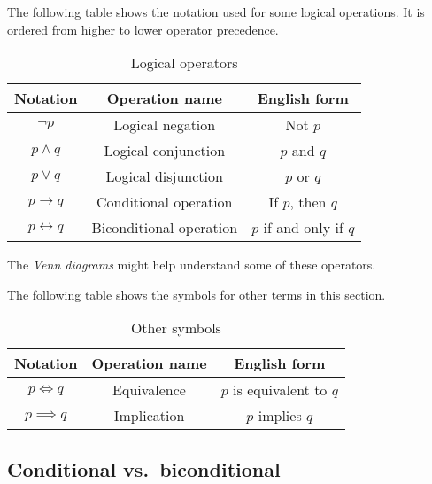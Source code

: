\documentclass{article}
\begin{document}
The following table shows the notation used for some logical operations. It is
ordered from higher to lower operator precedence.

\begin{table}[h]
  \caption{\label{tbl:logic_op}Logical operators}
  \begin{center}
    \begin{tabular}{| c | c | c |}
      \hline
      Notation & Operation name & English form \\
      \hline
      $\neg p$              & Logical negation        & Not $p$ \\
      $p \land q$           & Logical conjunction     & $p$ and $q$ \\
      $p \lor q$            & Logical disjunction     & $p$ or $q$ \\
      $p \to q$             & Conditional operation   & If $p$, then $q$ \\
      $p \leftrightarrow q$ & Biconditional operation & $p$ if and only if $q$ \\
      \hline
    \end{tabular}
  \end{center}
\end{table}

The \textit{Venn diagrams} might help understand some of these operators.

\medskip

The following table shows the symbols for other terms in this section.

\begin{table}[h]
  \caption{\label{tbl:logic_osym}Other symbols}
  \begin{center}
    \begin{tabular}{| c | c | c |}
      \hline
      Notation & Operation name & English form \\
      \hline
      $p \iff q$     & Equivalence & $p$ is equivalent to $q$ \\
      $p \implies q$ & Implication & $p$ implies $q$ \\
      \hline
    \end{tabular}
  \end{center}
\end{table}

\subsection{Conditional vs.~biconditional}
\end{document}
